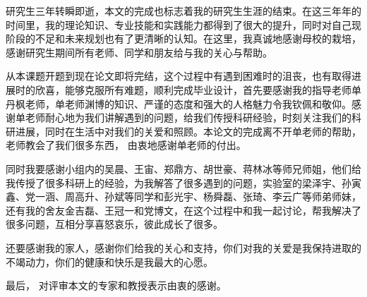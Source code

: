 
研究生三年转瞬即逝，本文的完成也标志着我的研究生生涯的结束。在这三年年的时间里，我的理论知识、专业技能和实践能力都得到了很大的提升，同时对自己现阶段的不足和未来规划也有了更清晰的认知。在这里，我真诚地感谢母校的栽培，感谢研究生期间所有老师、同学和朋友给与我的关心与帮助。

从本课题开题到现在论文即将完结，这个过程中有遇到困难时的沮丧，也有取得进展时的欣喜，能够克服所有难题，顺利完成毕业设计，首先要感谢我的指导老师单丹枫老师，单老师渊博的知识、严谨的态度和强大的人格魅力令我钦佩和敬仰。感谢单老师耐心地为我们讲解遇到的问题，给我们传授科研经验，时刻关注我们的科研进展，同时在生活中对我们的关爱和照顾。本论文的完成离不开单老师的帮助，老师教会了我们很多东西， 由衷地感谢单老师的付出。

同时我要感谢小组内的吴晨、王宙、郑鼎方、胡世豪、蒋林冰等师兄师姐，他们给我传授了很多科研上的经验，为我解答了很多遇到的问题，实验室的梁泽宇、孙寅鑫、党一涵、周高升、孙斌等同学和彭光宇、杨舜磊、张琦、李云广等师弟师妹，还有我的舍友金吉磊、王冠一和党博文，在这个过程中和我一起讨论，帮我解决了很多问题，互相分享喜怒哀乐，彼此成长了很多。

还要感谢我的家人，感谢你们给我的关心和支持，你们对我的关爱是我保持进取的不竭动力，你们的健康和快乐是我最大的心愿。

最后， 对评审本文的专家和教授表示由衷的感谢。